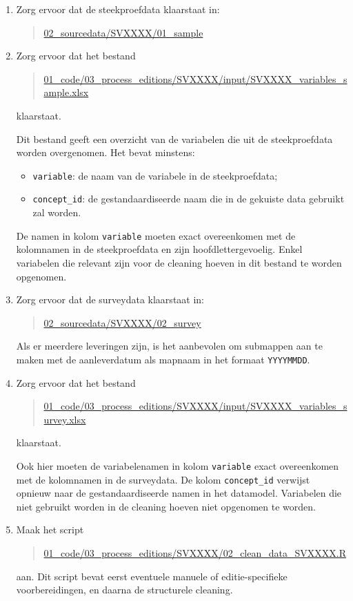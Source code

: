 \documentclass{VSAnote}
\begin{document}
\begin{enumerate}

\item Zorg ervoor dat de steekproefdata klaarstaat in:
\begin{quote}
\url{02_sourcedata/SVXXXX/01_sample}
\end{quote}

\item Zorg ervoor dat het bestand
\begin{quote}
\url{01_code/03_process_editions/SVXXXX/input/SVXXXX_variables_sample.xlsx}
\end{quote}
klaarstaat.

Dit bestand geeft een overzicht van de variabelen die uit de steekproefdata worden overgenomen. Het bevat minstens:
\begin{itemize}[nosep]
\item \verb+variable+: de naam van de variabele in de steekproefdata;
\item \verb+concept_id+: de gestandaardiseerde naam die in de gekuiste data gebruikt zal worden.
\end{itemize}

De namen in kolom \verb+variable+ moeten exact overeenkomen met de kolomnamen in de steekproefdata en zijn hoofdlettergevoelig. Enkel variabelen die relevant zijn voor de cleaning hoeven in dit bestand te worden opgenomen.

\item Zorg ervoor dat de surveydata klaarstaat in:
\begin{quote}
\url{02_sourcedata/SVXXXX/02_survey}
\end{quote}
Als er meerdere leveringen zijn, is het aanbevolen om submappen aan te maken met de aanleverdatum als mapnaam in het formaat \texttt{YYYYMMDD}.

\item Zorg ervoor dat het bestand
\begin{quote}
\url{01_code/03_process_editions/SVXXXX/input/SVXXXX_variables_survey.xlsx}
\end{quote}
klaarstaat.

Ook hier moeten de variabelenamen in kolom \verb+variable+ exact overeenkomen met de kolomnamen in de surveydata. De kolom \verb+concept_id+ verwijst opnieuw naar de gestandaardiseerde namen in het datamodel. Variabelen die niet gebruikt worden in de cleaning hoeven niet opgenomen te worden.

\item Maak het script
\begin{quote}
\url{01_code/03_process_editions/SVXXXX/02_clean_data_SVXXXX.R}
\end{quote}
aan. Dit script bevat eerst eventuele manuele of editie-specifieke voorbereidingen, en daarna de structurele cleaning.


\end{enumerate}
\end{document}
